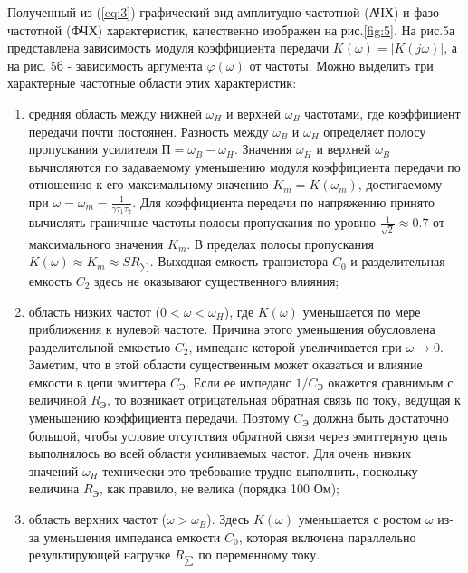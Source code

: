 Полученный из (\ref{eq:3}) графический вид амплитудно-частотной (АЧХ) и фазо-частотной (ФЧХ) характеристик, качественно изображен на рис.\ref{fig:5}. На рис.5а представлена зависимость модуля коэффициента передачи $K(\omega) = |K(j\omega)|$, а на рис. 5б - зависимость аргумента $\varphi(\omega)$ от частоты. Можно выделить три характерные
частотные области этих характеристик:
\begin{enumerate}
	\item средняя область между нижней $\omega_H$ и верхней $\omega_B$ частотами, где коэффициент передачи почти постоянен. Разность между $\omega_B$ и $\omega_H$ определяет полосу пропускания усилителя $\text{П}=\omega_B - \omega_H$. Значения $\omega_H$ и верхней $\omega_B$ вычисляются по задаваемому уменьшению модуля коэффициента передачи по отношению к его максимальному значению $K_m=K(\omega_m)$, достигаемому при $\omega=\omega_m=\frac{1}{\gamma \tau_1 \tau_2}$. Для коэффициента передачи по напряжению принято вычислять граничные частоты полосы пропускания по уровню $\frac{1}{\sqrt{2}} \approx 0.7$ от максимального значения $K_m$. В пределах полосы пропускания $K(\omega) \approx K_m \approx SR_{\sum}$. Выходная емкость транзистора $C_0$ и разделительная емкость $C_2$ здесь не оказывают существенного влияния; 

\item область низких частот ($0 <\omega<\omega_H$), где $K(\omega)$ уменьшается по мере приближения к нулевой частоте. Причина этого уменьшения обусловлена разделительной емкостью $C_2$, импеданс которой увеличивается при $\omega \rightarrow 0$. Заметим, что в этой области существенным может оказаться и влияние емкости в цепи эмиттера $C_{\text{Э}}$. Если ее импеданс $1/C_{\text{Э}}$ окажется сравнимым с величиной $R_{\text{Э}}$, то возникает отрицательная обратная связь по току, ведущая к уменьшению коэффициента передачи. Поэтому $C_{\text{Э}}$ должна быть достаточно большой, чтобы условие отсутствия обратной связи через эмиттерную цепь выполнялось во всей области усиливаемых частот. Для очень низких значений $\omega_H$ технически это требование трудно выполнить, поскольку величина $R_{\text{Э}}$, как правило, не велика (порядка 100 Ом);

\item область верхних частот ($\omega > \omega_B$). Здесь $K(\omega)$ уменьшается с ростом $\omega$ из-за уменьшения импеданса емкости $C_0$, которая включена параллельно результирующей нагрузке $R_{\sum}$ по переменному току.
\end{enumerate}

